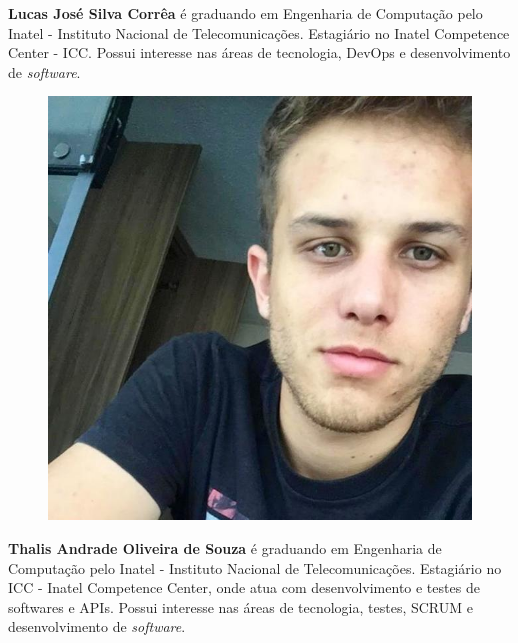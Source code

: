 \textbf{Lucas José Silva Corrêa} é graduando em Engenharia de Computação pelo Inatel - Instituto Nacional de Telecomunicações. Estagiário no Inatel Competence Center - ICC. Possui interesse nas áreas de tecnologia, DevOps e desenvolvimento de \textit{software}.\newline

\begin{figure}
\includegraphics[width=\linewidth]{figuras/autor_thalis.jpg}
\end{figure}

\textbf{Thalis Andrade Oliveira de Souza} é graduando em Engenharia de Computação pelo Inatel - Instituto Nacional de Telecomunicações. Estagiário no ICC -  Inatel Competence Center, onde atua com desenvolvimento e testes de softwares e APIs. Possui interesse nas áreas de tecnologia, testes, SCRUM e desenvolvimento de \textit{software}.\newline

